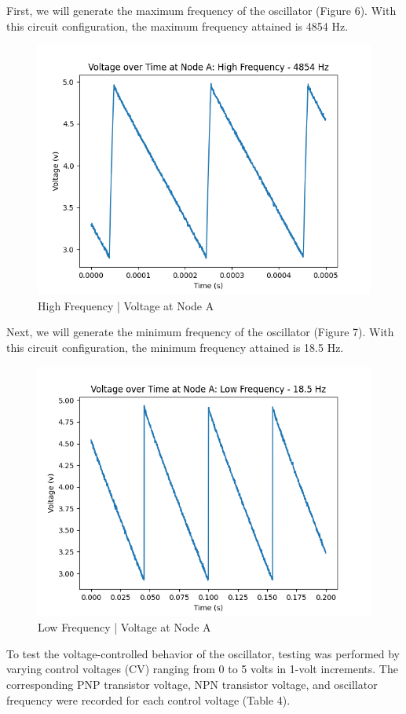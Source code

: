 \documentclass{article}
\begin{document}
First, we will generate the maximum frequency of the oscillator (Figure 6). With this circuit configuration, the maximum frequency attained is 4854 Hz.

\begin{figure}[H]
  \centering
  \includegraphics[width=.7\linewidth]{png/Figure_5.png}
  \caption{High Frequency | Voltage at Node A}
\end{figure}

Next, we will generate the minimum frequency of the oscillator (Figure 7). With this circuit configuration, the minimum frequency attained is 18.5 Hz.

\begin{figure}[H]
  \centering
  \includegraphics[width=.7\linewidth]{png/Figure_4.png}
  \caption{Low Frequency | Voltage at Node A}
\end{figure}

To test the voltage-controlled behavior of the oscillator, testing was performed by varying control voltages (CV) ranging from 0 to 5 volts in 1-volt increments. The corresponding PNP transistor voltage, NPN transistor voltage, and oscillator frequency were recorded for each control voltage (Table 4).
\end{document}
